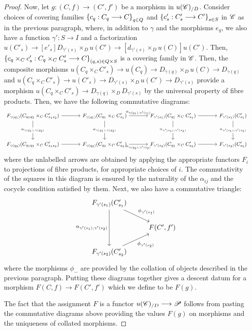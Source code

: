 \documentclass[11pt]{amsart}
\begin{document}
\begin{proof}
Now, let $g : (C, f) \to (C', f')$ be a morphism in $u(\mathscr{C})_{/D}$. Consider choices of covering
families
$\set{c_q : C_q \to C}_{q \in Q}$ and $\set{c'_s : C'_s \to C'}_{s \in S}$ in $\mathscr{C}$ as in the
previous paragraph, where, in addition to $\gamma$ and the morphisms $e_q$,
we also have a function $\gamma' : S \to I$ and a factorization
$u(C'_s) \to[e'_s] D_{\gamma'(s)} \times_{D} u(C') \to[d_{\gamma'(s)} \times_D u(C)] u(C')$.
Then, $\set{c_q \times_C c'_s : C_q \times_C C'_s \to C}_{(q, s) \in Q \times S}$
is a covering family in $\mathscr{C}$. Then, the composite morphisms
$u(C_q \times_C C'_s) \to u(C_q) \to D_{\gamma(q)} \times_D u(C) \to D_{\gamma(q)}$
and $u(C_q \times_C C'_s) \to u(C'_s) \to D_{\gamma'(s)} \times_D u(C') \to D_{\gamma'(s)}$
provide a morphism $u(C_q \times_C C'_s) \to D_{\gamma(q)} \times_D D_{\gamma'(s)}$ by the universal
property of fibre products. Then, we have the following commutative diagrams:
\[\begin{small}\begin{tikzcd}[row sep=huge, column sep=large]
F_{\gamma(q_1)}(C_{q_1q_2} \times_C C'_{s_1s_2}) \ar[r]
    \ar[d, "\alpha_{\gamma(q_1), \gamma(q_2)}" description] &
F_{\gamma(q_1)}(C_{q_1} \times_C C'_{s_1}) \ar[r, "\alpha_{\gamma(q_1), \gamma'(s_1)}"]
    \ar[d, "\alpha_{\gamma(q_1), \gamma(q_2)}" description] &
F_{\gamma'(s_1)}(C_{q_1} \times_C C'_{s_1}) \ar[r]
    \ar[d, "\alpha_{\gamma'(s_1), \gamma'(s_2)}" description] &
F_{\gamma'(s_1)}(C'_{s_1})
    \ar[d, "\alpha_{\gamma'(s_1), \gamma'(s_2)}" description] \\
F_{\gamma(q_2)}(C_{q_1q_2} \times_C C'_{s_1s_2}) \ar[r] &
F_{\gamma(q_2)}(C_{q_2} \times_C C'_{s_2}) \ar[r, "\alpha_{\gamma(q_2), \gamma'(s_2)}" below] &
F_{\gamma'(s_2)}(C_{q_2} \times_C C'_{s_2}) \ar[r] &
F_{\gamma'(s_2)}(C'_{s_2})
\end{tikzcd}\end{small}\]
where the unlabelled arrows are obtained by applying the appropriate functors $F_i$
to projections of fibre products, for appropriate choices of $i$. The commutativity of the
squares in this diagram is ensured by the naturality of the $\alpha_{ij}$ and the cocycle
condition satisfied by them. Next, we also have a commutative triangle:
\[\begin{tikzcd}
F_{\gamma'(s_1)}(C'_{s_1})
    \ar[rd, "\phi_{\gamma'(s_1)}" above right]
    \ar[dd, "\alpha_{\gamma'(s_1), \gamma'(s_2)}" left] & \\
& F(C', f') \\
F_{\gamma'(s_2)}(C'_{s_2})
    \ar[ru, "\phi_{\gamma'(s_2)}" below right]
\end{tikzcd}\]
where the morphisms $\phi_{-}$ are provided by the collation of objects described in the previous
paragraph.
Putting these diagrams together gives a descent datum for a morphism
$F(C, f) \to F(C', f')$ which we define to be $F(g)$.

The fact that the assignment $F$ is
a functor $u(\sC)_{/D} \to \sP$ follows from pasting the commutative diagrams above
providing the values $F(g)$ on morphisms and the uniqueness of collated morphisms.
\end{proof}
\end{document}
